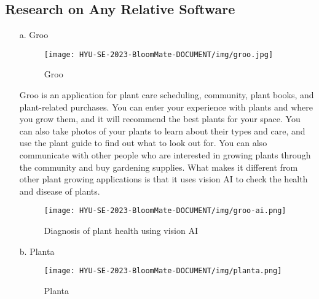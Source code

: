 \documentclass[conference, a4paper]{IEEEtran}
\begin{document}
\subsection{Research on Any Relative Software}
\begin{enumerate}
    \item[a.]Groo
    
\begin{figure}[h]
\texttt{[image: HYU-SE-2023-BloomMate-DOCUMENT/img/groo.jpg]}
\label{fig:Groo}
\caption{Groo} 
\end{figure}

    \item[]Groo is an application for plant care scheduling, community, plant books, and plant-related purchases. You can enter your experience with plants and where you grow them, and it will recommend the best plants for your space. You can also take photos of your plants to learn about their types and care, and use the plant guide to find out what to look out for. You can also communicate with other people who are interested in growing plants through the community and buy gardening supplies. What makes it different from other plant growing applications is that it uses vision AI to check the health and disease of plants.
    
\begin{figure}[h]
\texttt{[image: HYU-SE-2023-BloomMate-DOCUMENT/img/groo-ai.png]}
\label{fig:GrooAI}
\caption{Diagnosis of plant health using vision AI} 
\end{figure}

\item[b.]Planta

\begin{figure}[h]
\texttt{[image: HYU-SE-2023-BloomMate-DOCUMENT/img/planta.png]}
\label{fig:Planta}
\caption{Planta} 
\end{figure}


\end{enumerate}
\end{document}
